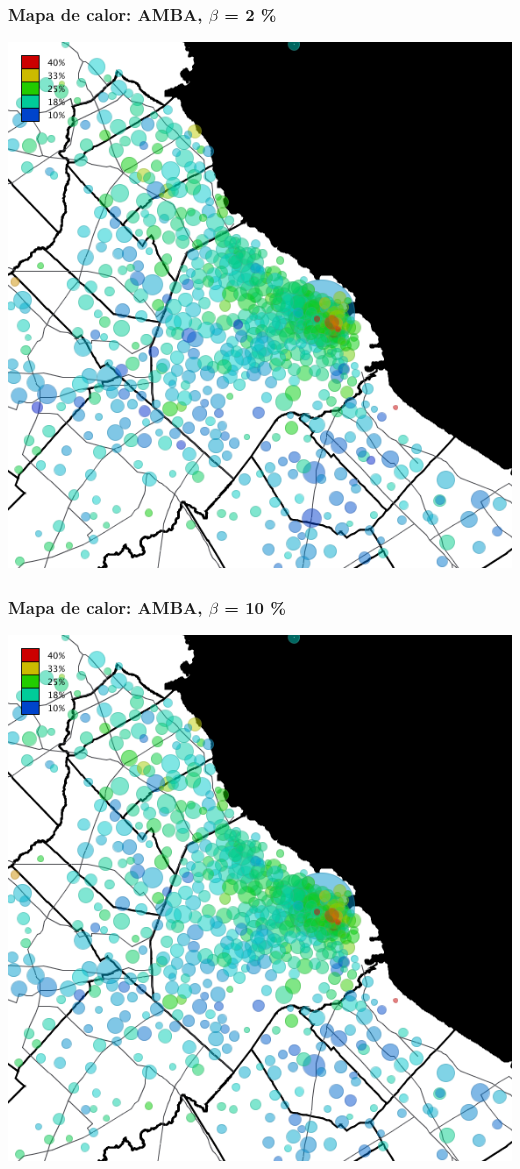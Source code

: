 \documentclass[xcolor=x11names]{beamer}
\begin{document}
\begin{frame}
	\frametitle{Mapa de calor: AMBA, $\beta$ = 2 \%}
	\centering
	\includegraphics[height=.9\textheight,width = .9\columnwidth,keepaspectratio]
	{slides/201112_hi_res_amba_usuarios_proporcion_circulos_beta2.png}
\end{frame}
\begin{frame}
	\frametitle{Mapa de calor: AMBA, $\beta$ = 10 \%}
	\centering
	\includegraphics[height=.9\textheight,width = .9\columnwidth,keepaspectratio]
	{slides/201112_hi_res_amba_usuarios_proporcion_circulos_beta10.png}
\end{frame}
\end{document}
